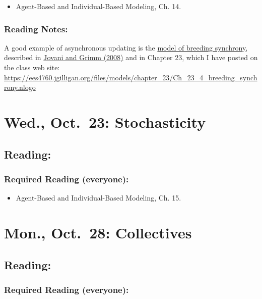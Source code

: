 \documentclass[
]{article}
\providecommand{\tightlist}{%
  \setlength{\itemsep}{0pt}\setlength{\parskip}{0pt}}
\begin{document}
\begin{itemize}
\tightlist
\item
  Agent-Based and Individual-Based Modeling, Ch. 14.
\end{itemize}

\subsubsection{Reading Notes:}\label{reading-notes-13}

A good example of asynchronous updating is the
\href{/files/models/chapter_23/Ch_23_4_breeding_synchrony.nlogo}{model
of breeding synchrony}, described in
\href{/files/models/chapter_05/Jovani_Grimm_2008_Breeding.pdf}{Jovani
and Grimm (2008)} and in Chapter 23, which I have posted on the class
web site:
\url{https://ees4760.jgilligan.org/files/models/chapter_23/Ch_23_4_breeding_synchrony.nlogo}

\section{Wed., Oct.~23: Stochasticity}\label{wed.-oct.-23-stochasticity}

\subsection{Reading:}\label{reading-17}

\subsubsection{Required Reading
(everyone):}\label{required-reading-everyone-14}

\begin{itemize}
\tightlist
\item
  Agent-Based and Individual-Based Modeling, Ch. 15.
\end{itemize}

\section{Mon., Oct.~28: Collectives}\label{mon.-oct.-28-collectives}

\subsection{Reading:}\label{reading-18}

\subsubsection{Required Reading
(everyone):}\label{required-reading-everyone-15}
\end{document}
